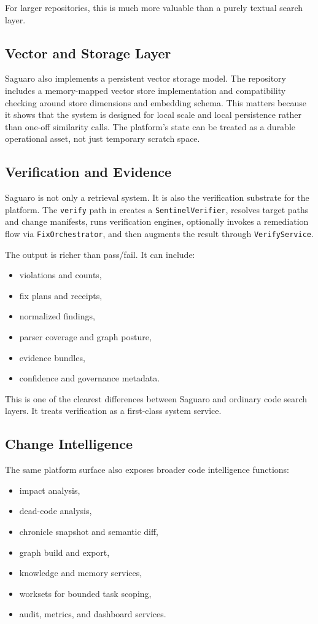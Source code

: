 \documentclass[11pt,a4paper]{article}
\begin{document}
For larger repositories, this is much more valuable than a purely textual search layer.

\subsection{Vector and Storage Layer}
Saguaro also implements a persistent vector storage model. The repository includes a memory-mapped vector store implementation and compatibility checking around store dimensions and embedding schema. This matters because it shows that the system is designed for local scale and local persistence rather than one-off similarity calls. The platform's state can be treated as a durable operational asset, not just temporary scratch space.

\subsection{Verification and Evidence}
Saguaro is not only a retrieval system. It is also the verification substrate for the platform. The \texttt{verify} path in  creates a \texttt{SentinelVerifier}, resolves target paths and change manifests, runs verification engines, optionally invokes a remediation flow via \texttt{FixOrchestrator}, and then augments the result through \texttt{VerifyService}.

The output is richer than pass/fail. It can include:
\begin{itemize}
    \item violations and counts,
    \item fix plans and receipts,
    \item normalized findings,
    \item parser coverage and graph posture,
    \item evidence bundles,
    \item confidence and governance metadata.
\end{itemize}

This is one of the clearest differences between Saguaro and ordinary code search layers. It treats verification as a first-class system service.

\subsection{Change Intelligence}
The same platform surface also exposes broader code intelligence functions:
\begin{itemize}
    \item impact analysis,
    \item dead-code analysis,
    \item chronicle snapshot and semantic diff,
    \item graph build and export,
    \item knowledge and memory services,
    \item worksets for bounded task scoping,
    \item audit, metrics, and dashboard services.
\end{itemize}
\end{document}
